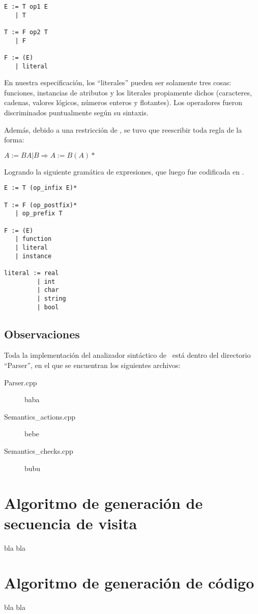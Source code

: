 \begin{lstlisting}[backgroundcolor=\color{white}]
E := T op1 E
   | T

T := F op2 T
   | F

F := (E)
   | literal
\end{lstlisting}

En nuestra especificación, los ``literales'' pueden ser solamente tres cosas: funciones, instancias de atributos y los literales propiamente dichos (caracteres, cadenas, valores lógicos, números enteros y flotantes). Los operadores fueron discriminados puntualmente según su sintaxis.

Además, debido a una restricción de \spirit, se tuvo que reescribir toda regla de la forma:

\begin{center}\textbf{\large{$ A := B A | B  \Rightarrow  A := B (A)* $}}\end{center}

Logrando la siguiente gramática de expresiones, que luego fue codificada en \spirit.

\begin{lstlisting}[backgroundcolor=\color{white}]
E := T (op_infix E)*

T := F (op_postfix)*
   | op_prefix T

F := (E)
   | function
   | literal
   | instance

literal := real
         | int
         | char
         | string
         | bool
\end{lstlisting}


\subsection*{Observaciones}

Toda la implementación del analizador sintáctico de \maggen\ está dentro del directorio ``Parser'', en el que se encuentran los siguientes archivos:

\begin{description}
\item [Parser.cpp] baba
\item [Semantics\_actions.cpp] bebe
\item [Semantics\_checks.cpp] bubu
\end{description}

\section{Algoritmo de generación de secuencia de visita}

bla bla
\section{Algoritmo de generación de código}
bla bla
